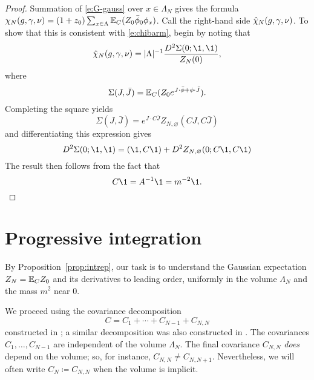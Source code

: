 \begin{proof}
Summation of \eqref{e:G-gauss} over $x\in \Lambda_N$ gives the formula
$\chi_N(g,\gamma,\nu) = (1+z_0)\sum_{x\in \Lambda} \mathbb{E}_C (Z_0\bar\phi_0\phi_x)$.
Call the right-hand side $\hat\chi_N(g,\gamma,\nu)$. To show that this is
consistent with \eqref{e:chibarm}, begin by noting that
\begin{equation}
\hat\chi_N(\gcc,\gamma,\nu)
	=
|\Lambda|^{-1} \frac{D^2 \Sigma(0; \1, \1)}{Z_N(0)},
\end{equation}
where
\begin{equation}
\Sigma(J, \bar J) = \mathbb{E}_C (Z_0 e^{J \cdot \bar\phi + \phi \cdot \bar J}).
\end{equation}
Completing the square yields
\begin{equation}
\Sigma(J, \bar J)
	=
e^{J \cdot C \bar J} Z_{N,\varnothing}(C J, C \bar J)
\end{equation}
and differentiating this expression gives
\begin{equation}
D^2 \Sigma(0; \1, \1)
	=
(\1, C \1) + D^2 Z_{N,\varnothing}(0; C\1, C\1)
\end{equation}
The result then follows from the fact that
\begin{equation}
C \1 = A^{-1} \1 = m^{-2} \1.
\end{equation}
\end{proof}


\section{Progressive integration}
\label{sec:prog}

By Proposition~\ref{prop:intrep}, our task is to understand the Gaussian expectation
$Z_N = \mathbb{E}_C Z_0$ and its derivatives to leading order, uniformly in the volume
$\Lambda_N$ and the mass $m^2$ near $0$.

We proceed using the covariance decomposition
\begin{equation}
\label{e:NCj}
C = C_1 + \cdots + C_{N-1} + C_{N,N}
\end{equation}
constructed in \cite{Baue13a}; a similar decomposition was also constructed in \cite{BGM04}.
The covariances $C_1, \ldots, C_{N-1}$ are independent of the volume $\Lambda_N$. The final
covariance $C_{N,N}$ \emph{does} depend on the volume; so, for instance, $C_{N,N} \ne C_{N,N+1}$.
Nevertheless, we will often write $C_N \coloneqq C_{N,N}$ when the volume is implicit.

